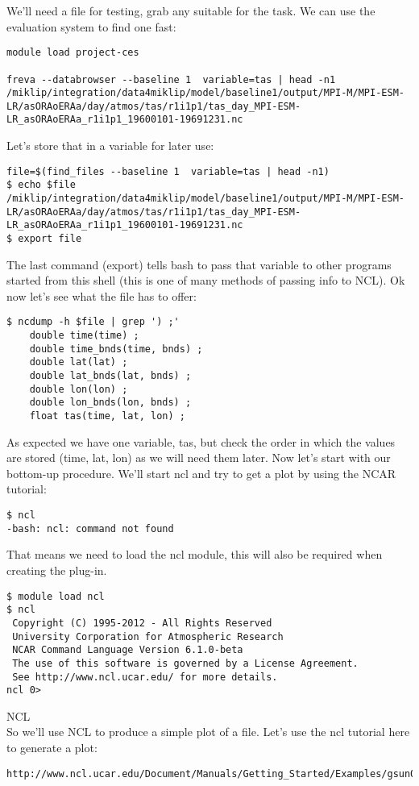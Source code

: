 \documentclass[a4paper,11pt]{ltxdoc}
\begin{document}
We'll need a file for testing, grab any suitable for the task. We can use the evaluation system to find one fast:
\begin{verbatim}
module load project-ces

freva --databrowser --baseline 1  variable=tas | head -n1
/miklip/integration/data4miklip/model/baseline1/output/MPI-M/MPI-ESM-LR/asORAoERAa/day/atmos/tas/r1i1p1/tas_day_MPI-ESM-LR_asORAoERAa_r1i1p1_19600101-19691231.nc
\end{verbatim}
Let's store that in a variable for later use:
\begin{verbatim}
file=$(find_files --baseline 1  variable=tas | head -n1)
$ echo $file
/miklip/integration/data4miklip/model/baseline1/output/MPI-M/MPI-ESM-LR/asORAoERAa/day/atmos/tas/r1i1p1/tas_day_MPI-ESM-LR_asORAoERAa_r1i1p1_19600101-19691231.nc
$ export file
\end{verbatim}
The last command (export) tells bash to pass that variable to other programs started from this shell (this is one of many methods of passing info to NCL). Ok now let's see what the file has to offer:
\begin{verbatim}
$ ncdump -h $file | grep ') ;'
    double time(time) ;
    double time_bnds(time, bnds) ;
    double lat(lat) ;
    double lat_bnds(lat, bnds) ;
    double lon(lon) ;
    double lon_bnds(lon, bnds) ;
    float tas(time, lat, lon) ;
\end{verbatim}
As expected we have one variable, tas, but check the order in which the values are stored (time, lat, lon) as we will need them later.
Now let's start with our bottom-up procedure. We'll start ncl and try to get a plot by using the NCAR tutorial:
\begin{verbatim}
$ ncl
-bash: ncl: command not found
\end{verbatim}
That means we need to load the ncl module, this will also be required when creating the plug-in.
\begin{verbatim}
$ module load ncl
$ ncl
 Copyright (C) 1995-2012 - All Rights Reserved
 University Corporation for Atmospheric Research
 NCAR Command Language Version 6.1.0-beta
 The use of this software is governed by a License Agreement.
 See http://www.ncl.ucar.edu/ for more details.
ncl 0> 
\end{verbatim}
NCL \\
So we'll use NCL to produce a simple plot of a file. Let's use the ncl tutorial here to generate a plot:  \begin{verbatim}http://www.ncl.ucar.edu/Document/Manuals/Getting_Started/Examples/gsun02n.shtml\end{verbatim}
\end{document}
